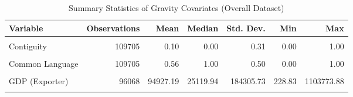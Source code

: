 \begin{table}[!h]
\centering
\caption{\label{tab:tab:overall_vars}Summary Statistics of Gravity Covariates (Overall Dataset)}
\centering
\begin{tabular}[t]{lrrrrrr}
\toprule
Variable & Observations & Mean & Median & Std. Dev. & Min & Max\\
\midrule
\cellcolor{gray!10}{Distance} & \cellcolor{gray!10}{109705} & \cellcolor{gray!10}{3422.61} & \cellcolor{gray!10}{3232.34} & \cellcolor{gray!10}{1910.97} & \cellcolor{gray!10}{158.20} & \cellcolor{gray!10}{9760.23}\\
Contiguity & 109705 & 0.10 & 0.00 & 0.31 & 0.00 & 1.00\\
\cellcolor{gray!10}{Colony} & \cellcolor{gray!10}{109705} & \cellcolor{gray!10}{0.01} & \cellcolor{gray!10}{0.00} & \cellcolor{gray!10}{0.08} & \cellcolor{gray!10}{0.00} & \cellcolor{gray!10}{1.00}\\
Common Language & 109705 & 0.56 & 1.00 & 0.50 & 0.00 & 1.00\\
\cellcolor{gray!10}{RTA} & \cellcolor{gray!10}{109705} & \cellcolor{gray!10}{0.11} & \cellcolor{gray!10}{0.00} & \cellcolor{gray!10}{0.31} & \cellcolor{gray!10}{0.00} & \cellcolor{gray!10}{1.00}\\
\addlinespace
GDP (Exporter) & 96068 & 94927.19 & 25119.94 & 184305.73 & 228.83 & 1103773.88\\
\cellcolor{gray!10}{GDP (Importer)} & \cellcolor{gray!10}{95994} & \cellcolor{gray!10}{91201.60} & \cellcolor{gray!10}{24068.14} & \cellcolor{gray!10}{179688.37} & \cellcolor{gray!10}{228.83} & \cellcolor{gray!10}{1103773.88}\\
\bottomrule
\end{tabular}
\end{table}
